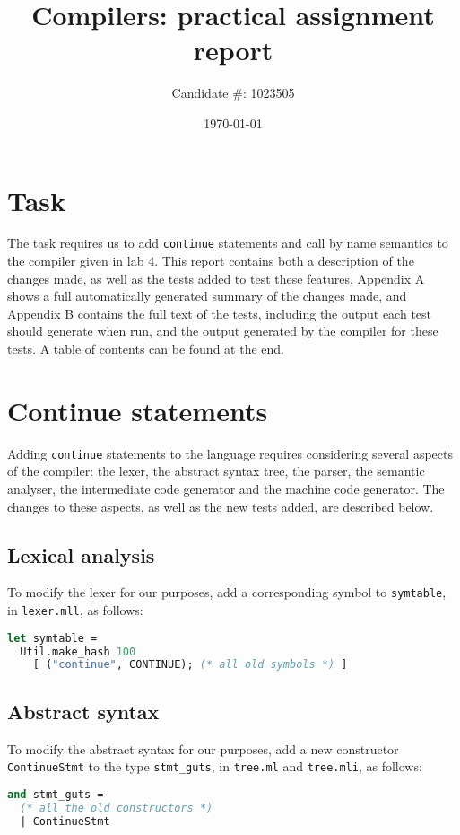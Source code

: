\documentclass[a4paper,10pt]{article}
\title{Compilers: practical assignment report}
\author{Candidate \#: 1023505}
\date{\today}
\begin{document}
\lstset{style=tvnstyle}

\maketitle

\section{Task}
The task requires us to add \texttt{continue} statements and call by name semantics to the compiler given in lab 4. This report contains both a description of the changes made, as well as the tests added to test these features. Appendix A shows a full automatically generated summary of the changes made, and Appendix B contains the full text of the tests, including the output each test should generate when run, and the output generated by the compiler for these tests. A table of contents can be found at the end.

\section{Continue statements}
Adding \texttt{continue} statements to the language requires considering several aspects of the compiler: the lexer, the abstract syntax tree, the parser, the semantic analyser, the intermediate code generator and the machine code generator. The changes to these aspects, as well as the new tests added, are described below.

\subsection{Lexical analysis}
To modify the lexer for our purposes, add a corresponding symbol to \texttt{symtable}, in \texttt{lexer.mll}, as follows:

\begin{lstlisting}[language=ml]
let symtable = 
  Util.make_hash 100
    [ ("continue", CONTINUE); (* all old symbols *) ]
\end{lstlisting}

\subsection{Abstract syntax}
To modify the abstract syntax for our purposes, add a new constructor \texttt{ContinueStmt} to the type \texttt{stmt\_guts}, in \texttt{tree.ml} and \texttt{tree.mli}, as follows:

\begin{lstlisting}[language=ml]
and stmt_guts =
  (* all the old constructors *)
  | ContinueStmt
\end{lstlisting}
\end{document}
